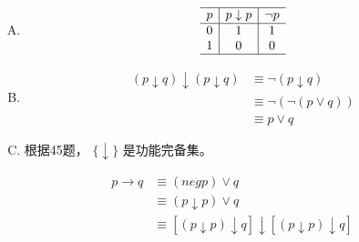 {{        %
        \begin{practices}
            \begin{enumerate}[A.]
                \item
                {
                    \begin{table}[H]
                        \[
                            \begin{array}{c|c|c}
                                \hline
                                p & p \downarrow p & \neg p \\
                                \hline
                                0 & 1 & 1 \\
                                1 & 0 & 0 \\
                                \hline
                           \end{array}
                       \]
                    \end{table}
                }
                \item
                {
                    \begin{align*}
                        (p \downarrow q) \downarrow (p \downarrow q)
                        &\equiv \neg (p \downarrow q) \\
                        &\equiv \neg (\neg (p \vee q)) \\
                        &\equiv p \vee q
                    \end{align*}
                }
                \item
                {
                    根据45题， $\{\downarrow\}$ 是功能完备集。
                }
            \end{enumerate}
        \end{practices}

        \begin{practices}
            \begin{align*}
                p \rightarrow q
                &\equiv (neg p) \vee q \\
                &\equiv (p \downarrow p) \vee q \\
                &\equiv [(p\downarrow p) \downarrow q] \downarrow [(p\downarrow p) \downarrow q]
            \end{align*}
        \end{practices}

}}
